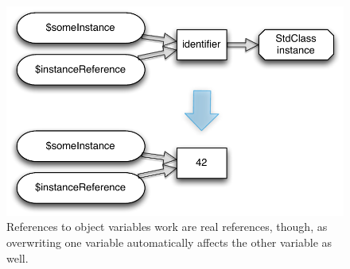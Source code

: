 \begin{figure}[!h]
  \begin{center}
    \includegraphics[scale=0.8]{images/someInstance_instanceReference}
    \caption{References to object variables work are real references, though, as overwriting one variable automatically affects the other variable as well.}
    \label{fig:real-object-references}
  \end{center}
\end{figure}
